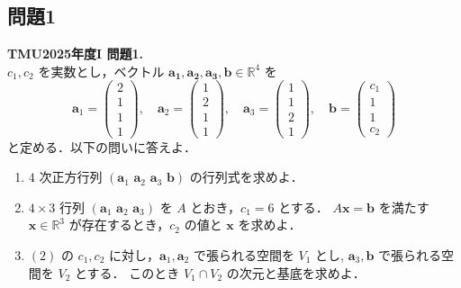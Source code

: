 \documentclass[titlepage]{jsarticle}
\numberwithin{equation}{section}
\begin{document}
\subsection{問題1}
\begin{problem}
\textbf{TMU2025年度I 問題1.}\\
$c_1, c_2$ を実数とし，ベクトル $\bm{a_1},\bm{a_2},\bm{a_3},\bm{b}\in\mathbb{R}^4$ を
\[
\bm{a}_1=
\begin{pmatrix}
2\\
1\\
1\\
1
\end{pmatrix},
\quad
\bm{a}_2=
\begin{pmatrix}
1\\
2\\
1\\
1
\end{pmatrix},
\quad
\bm{a}_3=
\begin{pmatrix}
1\\
1\\
2\\
1
\end{pmatrix},
\quad
\bm{b}=
\begin{pmatrix}
c_1\\
1\\
1\\
c_2
\end{pmatrix}
\]
と定める．以下の問いに答えよ．

\begin{enumerate}[label=(\arabic*)]
  \item $4$ 次正方行列 $(\bm{a}_1 \,\, \bm{a}_2 \,\, \bm{a}_3 \,\, \bm{b})$ の行列式を求めよ．

  \item $4\times 3$ 行列 $(\bm{a}_1 \,\, \bm{a}_2 \,\, \bm{a}_3)$ を $A$ とおき，$c_1=6$ とする．
  $A\bm{x}=\bm{b}$ を満たす $\bm{x}\in\mathbb{R}^3$ が存在するとき，$c_2$ の値と $\bm{x}$ を求めよ．

  \item $(2)$ の $c_1,c_2$ に対し，$\bm{a}_1,\bm{a}_2$ で張られる空間を $V_1$ とし, $\bm{a}_3,\bm{b}$ で張られる空間を $V_2$ とする．
  このとき $V_1\cap V_2$ の次元と基底を求めよ．
\end{enumerate}
\end{problem}
\end{document}
